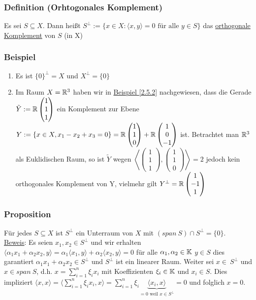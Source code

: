 \subsubsection{Definition (Orhtogonales Komplement)}
Es sei $S \subseteq X$. Dann heißt $S^\bot:=\{x\in X:\langle x,y \rangle =0\text{ für alle }y\in S\}$
 das \underline{orthogonale Komplement} von $S$ (in X)
\subsubsection{Beispiel}
\numbers
\begin{enumerate}
\item Es ist $\{0\}^\bot=X$ und $X^{\bot}=\{0\}$
\item Im Raum $X=\mathbb{R}^3$ haben wir in \hyperref[2.5.2]{Beispiel \ref*{2.5.2}} nachgewiesen, dass die Gerade $\tilde{Y}:=\mathbb{R}\begin{pmatrix}1 \\1 \\1\end{pmatrix}$ ein Komplement zur Ebene $Y:=\{x\in X, x_1-x_2+x_3=0\}=\mathbb{R}\begin{pmatrix}1\\1\\0\end{pmatrix}+\mathbb{R}\begin{pmatrix}1\\0\\-1\end{pmatrix}$ ist.
Betrachtet man $\mathbb{R}^3$ als Euklidischen Raum, so ist $\tilde{Y}$ wegen $\left\langle \begin{pmatrix}1 \\1 \\1\end{pmatrix},\begin{pmatrix}1 \\1 \\0\end{pmatrix}\right\rangle=2$ jedoch kein orthogonales Komplement von Y, vielmehr gilt $Y^{\bot}=\mathbb{R}\begin{pmatrix}1 \\-1 \\1\end{pmatrix}$
\end{enumerate}
\subsubsection{Proposition}
\label{5.1.9}
Für jedes $S\subseteq X$ ist $S^{\bot}$ ein Unterraum von $X$ mit $(span\ S)\cap S^{\bot}=\{0\}$.\\
\underline{Beweis}: Es seien $x_1,x_2\in S^{\bot}$ und wir erhalten $\langle \alpha_1 x_1+\alpha_2 x_2,y\rangle=\alpha_1\langle x_1,y\rangle+\alpha_2\langle x_2,y\rangle=0$ für alle $\alpha_1,\alpha_2\in\mathbb{K}$ $y\in S$ dies garantiert $\alpha_1 x_1+\alpha_2 x_2\in S^{\bot}$ und $S^{\bot}$ ist ein linearer Raum.
Weiter sei $x\in\ S^{\bot}$ und $x\in span~S$, d.h. $x=\sum_{i=1}^n \xi_i x_i$ mit Koeffizienten $\xi_i\in \mathbb{K}$ und $x_i\in S$. Dies impliziert $\langle x,x\rangle=\langle \sum_{i=1}^n \xi_i x_i,x\rangle=\sum_{i=1}^n\xi_i \underbrace{\langle x_i,x\rangle}_{=0\text{ weil }x\in S^{\bot}}=0$ und folglich $x=0$.
